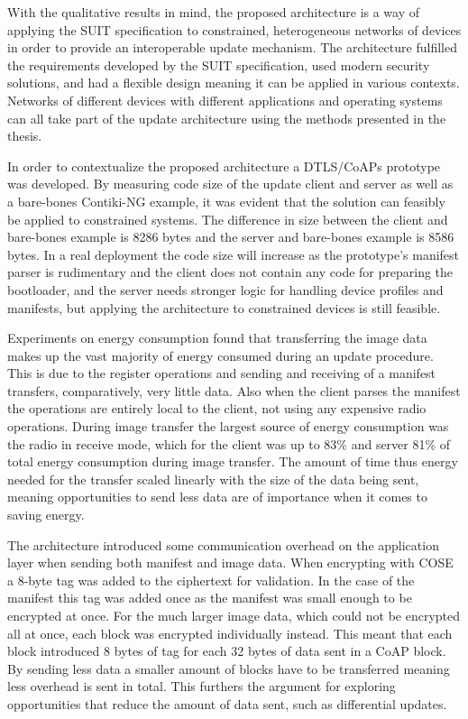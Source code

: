 \documentclass[0-thesis.tex]{subfiles}
\begin{document}
With the qualitative results in mind, the proposed architecture is a way of applying the
SUIT specification to constrained, heterogeneous networks of devices in order to provide
an interoperable update mechanism. The architecture fulfilled the requirements developed
by the SUIT specification, used modern security solutions, and had a flexible design
meaning it can be applied in various contexts. Networks of different devices with
different applications and operating systems can all take part of the update architecture
using the methods presented in the thesis.

In order to contextualize the proposed architecture a DTLS/CoAPs prototype was developed.
By measuring code size of the update client and server as well as a bare-bones Contiki-NG
example, it was evident that the solution can feasibly be applied to constrained systems.
The difference in size between the client and bare-bones example is 8286 bytes and the
server and bare-bones example is 8586 bytes. In a real deployment the code size will
increase as the prototype's manifest parser is rudimentary and the client does not contain
any code for preparing the bootloader, and the server needs stronger logic for handling
device profiles and manifests, but applying the architecture to constrained devices is
still feasible.

Experiments on energy consumption found that transferring the image data makes up the vast
majority of energy consumed during an update procedure. This is due to the register
operations and sending and receiving of a manifest transfers, comparatively, very little
data. Also when the client parses the manifest the operations are entirely local to the
client, not using any expensive radio operations. During image transfer the largest source
of energy consumption was the radio in receive mode, which for the client was up to 83\%
and server 81\% of total energy consumption during image transfer. The amount of time thus
energy needed for the transfer scaled linearly with the size of the data being sent,
meaning opportunities to send less data are of importance when it comes to saving energy.

The architecture introduced some communication overhead on the application layer when
sending both manifest and image data. When encrypting with COSE a 8-byte tag was added to
the ciphertext for validation. In the case of the manifest this tag was added once as the
manifest was small enough to be encrypted at once. For the much larger image data, which
could not be encrypted all at once, each block was encrypted individually instead. This
meant that each block introduced 8 bytes of tag for each 32 bytes of data sent in a CoAP
block. By sending less data a smaller amount of blocks have to be transferred meaning less
overhead is sent in total. This furthers the argument for exploring opportunities that
reduce the amount of data sent, such as differential updates.
\end{document}
